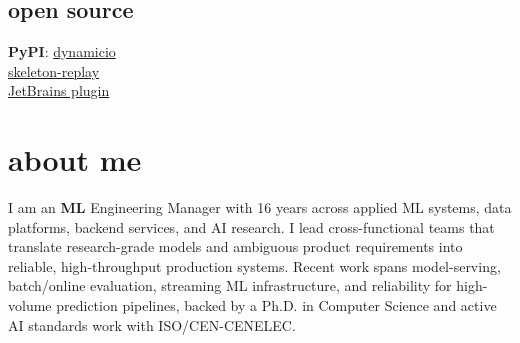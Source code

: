\documentclass[]{../../../../friggeri-cv}
\begin{document}
\begin{aside}
    \section{open source}
        {\footnotesize \textbf{PyPI}: \href{https://pypi.org/project/dynamicio/}{dynamicio}\\\href{https://pypi.org/project/skeleton-replay/}{skeleton-replay}\\\href{https://plugins.jetbrains.com/plugin/32807-skeleton-replay}{JetBrains plugin}}
\end{aside}

\section{about me}
{\normalsize I am an \textbf{ML} Engineering Manager with 16 years across applied ML systems, data platforms, backend services, and AI research. I lead cross-functional teams that translate research-grade models and ambiguous product requirements into reliable, high-throughput production systems. Recent work spans model-serving, batch/online evaluation, streaming ML infrastructure, and reliability for high-volume prediction pipelines, backed by a Ph.D. in Computer Science and active AI standards work with ISO/CEN-CENELEC.}
\end{document}
